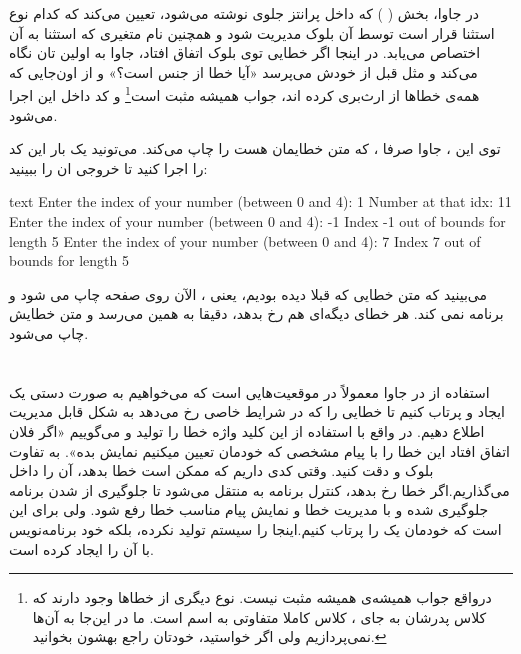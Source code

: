 در جاوا، بخش (  ) که داخل پرانتز جلوی
 نوشته می‌شود، تعیین می‌کند که کدام نوع استثنا
 قرار است توسط آن بلوک  مدیریت شود و
همچنین نام متغیری که استثنا به آن اختصاص می‌یابد. در اینجا اگر خطایی توی
بلوک  اتفاق افتاد، جاوا به اولین 
تان نگاه می‌کند و مثل قبل از خودش می‌پرسد «آیا خطا از جنس
 است؟» و از اون‌جایی که همه‌ی خطاها از
 ارث‌بری کرده اند، جواب همیشه مثبت است\footnote{درواقع
  جواب همیشه‌ی همیشه مثبت نیست. نوع دیگری از خطاها وجود دارند که کلاس
  پدرشان به جای  ، کلاس کاملا متفاوتی به اسم
   است. ما در این‌جا به آن‌ها نمی‌پردازیم ولی اگر
  خواستید، خودتان راجع بهشون بخوانید.} و کد داخل این 
اجرا می‌شود.

توی این  ، جاوا صرفا  ،
که متن خطایمان هست را چاپ می‌کند. می‌تونید یک بار این کد را اجرا کنید تا
خروجی ان را ببینید:

\begin{codebox}{text}
Enter the index of your number (between 0 and 4): 1  
Number at that idx: 11  
Enter the index of your number (between 0 and 4): -1  
Index -1 out of bounds for length 5  
Enter the index of your number (between 0 and 4): 7  
Index 7 out of bounds for length 5
\end{codebox}

می‌بینید که متن خطایی که قبلا دیده بودیم، یعنی
 ، الآن روی صفحه چاپ
می شود و برنامه  نمی کند. هر خطای دیگه‌ای هم رخ بدهد، دقیقا به
همین  می‌رسد و متن خطایش چاپ می‌شود.

\section{}

استفاده از  در جاوا معمولاً در موقعیت‌هایی است که
می‌خواهیم به صورت دستی یک  ایجاد و پرتاب کنیم تا خطایی را
که در شرایط خاصی رخ می‌دهد به شکل قابل مدیریت اطلاع دهیم. در واقع با
استفاده از این کلید واژه خطا را تولید و می‌گوییم «اگر فلان اتفاق افتاد
این خطا را با پیام مشخصی که خودمان تعیین میکنیم نمایش بده». به تفاوت
بلوک  و  دقت کنید. وقتی کدی داریم که ممکن است
خطا بدهد، آن را داخل  می‌گذاریم.اگر خطا رخ بدهد، کنترل
برنامه به  منتقل می‌شود تا جلوگیری از  شدن
برنامه جلوگیری شده و با مدیریت خطا و نمایش پیام مناسب خطا رفع شود. ولی
 برای این است که خودمان یک  را پرتاب
کنیم.اینجا  را سیستم تولید نکرده، بلکه خود برنامه‌نویس با
 آن را ایجاد کرده است.

